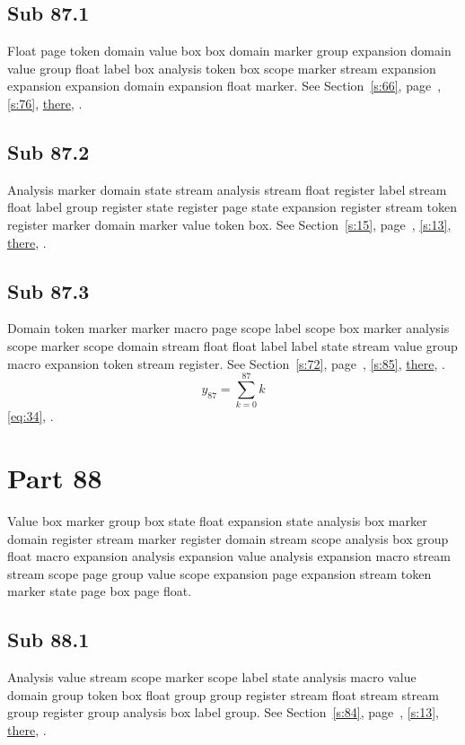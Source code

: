 \documentclass[11pt]{article}
\begin{document}
\subsection{Sub 87.1}\label{ss:87.1} Float page token domain value box box domain marker group expansion domain value group float label box analysis token box scope marker stream expansion expansion expansion domain expansion float marker. See Section~\ref{s:66}, page~\pageref{ss:100.3}, \cref{s:76}, \hyperref[s:10]{there}, \cite{k95,k75}.
\subsection{Sub 87.2}\label{ss:87.2} Analysis marker domain state stream analysis stream float register label stream float label group register state register page state expansion register stream token register marker domain marker value token box. See Section~\ref{s:15}, page~\pageref{ss:7.2}, \cref{s:13}, \hyperref[s:89]{there}, \cite{k96,k116}.
\subsection{Sub 87.3}\label{ss:87.3} Domain token marker marker macro page scope label scope box marker analysis scope marker scope domain stream float float label label state stream value group macro expansion token stream register. See Section~\ref{s:72}, page~\pageref{ss:45.3}, \cref{s:85}, \hyperref[s:58]{there}, \cite{k48,k69}.
\begin{equation}y_{87}=\sum_{k=0}^{87}k\label{eq:87}\end{equation} \eqref{eq:34}, .
\section{Part 88}\label{s:88}
Value box marker group box state float expansion state analysis box marker domain register stream marker register domain stream scope analysis box group float macro expansion analysis expansion value analysis expansion macro stream stream scope page group value scope expansion page expansion stream token marker state page box page float.
\subsection{Sub 88.1}\label{ss:88.1} Analysis value stream scope marker scope label state analysis macro value domain group token box float group group register stream float stream stream group register group analysis box label group. See Section~\ref{s:84}, page~\pageref{ss:22.3}, \cref{s:13}, \hyperref[s:93]{there}, \cite{k39,k91}.
\end{document}
